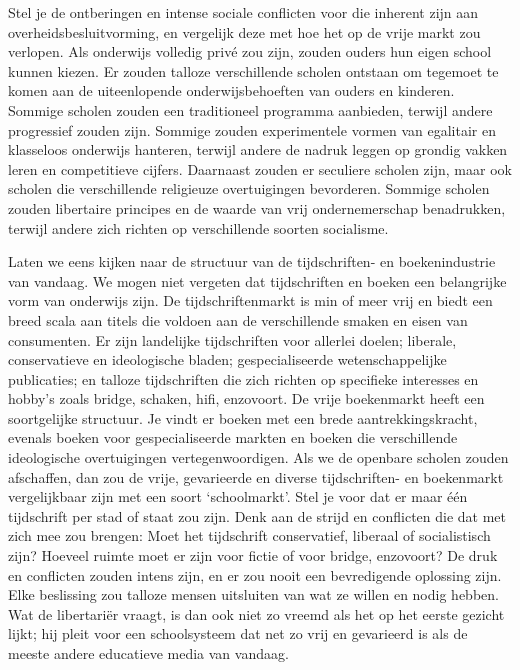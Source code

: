 \documentclass[
  a5paper,
  smalldemyvopaper,10pt,twoside,onecolumn,openright,extrafontsizes,hidelinks]{memoir}
\begin{document}
Stel je de ontberingen en intense sociale conflicten voor die inherent
zijn aan overheidsbesluitvorming, en vergelijk deze met hoe het op de
vrije markt zou verlopen. Als onderwijs volledig privé zou zijn, zouden
ouders hun eigen school kunnen kiezen. Er zouden talloze verschillende
scholen ontstaan om tegemoet te komen aan de uiteenlopende
onderwijsbehoeften van ouders en kinderen. Sommige scholen zouden een
traditioneel programma aanbieden, terwijl andere progressief zouden
zijn. Sommige zouden experimentele vormen van egalitair en klasseloos
onderwijs hanteren, terwijl andere de nadruk leggen op grondig vakken
leren en competitieve cijfers. Daarnaast zouden er seculiere scholen
zijn, maar ook scholen die verschillende religieuze overtuigingen
bevorderen. Sommige scholen zouden libertaire principes en de waarde van
vrij ondernemerschap benadrukken, terwijl andere zich richten op
verschillende soorten socialisme.

Laten we eens kijken naar de structuur van de tijdschriften- en
boekenindustrie van vandaag. We mogen niet vergeten dat tijdschriften en
boeken een belangrijke vorm van onderwijs zijn. De tijdschriftenmarkt is
min of meer vrij en biedt een breed scala aan titels die voldoen aan de
verschillende smaken en eisen van consumenten. Er zijn landelijke
tijdschriften voor allerlei doelen; liberale, conservatieve en
ideologische bladen; gespecialiseerde wetenschappelijke publicaties; en
talloze tijdschriften die zich richten op specifieke interesses en
hobby's zoals bridge, schaken, hifi, enzovoort. De vrije boekenmarkt
heeft een soortgelijke structuur. Je vindt er boeken met een brede
aantrekkingskracht, evenals boeken voor gespecialiseerde markten en
boeken die verschillende ideologische overtuigingen vertegenwoordigen.
Als we de openbare scholen zouden afschaffen, dan zou de vrije,
gevarieerde en diverse tijdschriften- en boekenmarkt vergelijkbaar zijn
met een soort `schoolmarkt'. Stel je voor dat er maar één tijdschrift
per stad of staat zou zijn. Denk aan de strijd en conflicten die dat met
zich mee zou brengen: Moet het tijdschrift conservatief, liberaal of
socialistisch zijn? Hoeveel ruimte moet er zijn voor fictie of voor
bridge, enzovoort? De druk en conflicten zouden intens zijn, en er zou
nooit een bevredigende oplossing zijn. Elke beslissing zou talloze
mensen uitsluiten van wat ze willen en nodig hebben. Wat de libertariër
vraagt, is dan ook niet zo vreemd als het op het eerste gezicht lijkt;
hij pleit voor een schoolsysteem dat net zo vrij en gevarieerd is als de
meeste andere educatieve media van vandaag.
\end{document}
